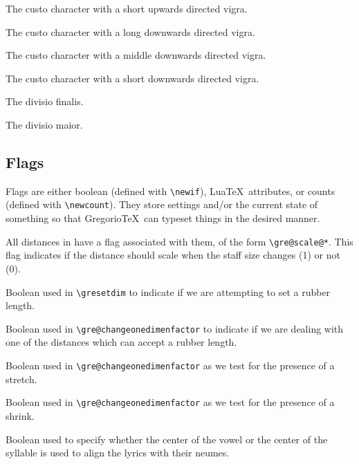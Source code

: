 The custo character with a short upwards directed vigra.

The custo character with a long downwards directed vigra.

The custo character with a middle downwards directed vigra.

The custo character with a short downwards directed vigra.

The divisio finalis.

The divisio maior.


\subsection{Flags}

Flags are either boolean (defined with \verb=\newif=), Lua\TeX\ attributes, or counts (defined with \verb=\newcount=).  They store settings and/or the current state of something so that Gregorio\TeX\ can typeset things in the desired manner.

All distances in  have a flag associated with them, of the form \verb=\gre@scale@*=.  This flag
indicates if the distance should scale when the staff size changes (1)
or not (0).

Boolean used in \verb=\gresetdim= to indicate if we are attempting to set a rubber length.

Boolean used in \verb=\gre@changeonedimenfactor= to indicate if we are dealing with one of the distances which can accept a rubber length.

Boolean used in \verb=\gre@changeonedimenfactor= as we test for the presence of a stretch.

Boolean used in \verb=\gre@changeonedimenfactor= as we test for the presence of a shrink.

Boolean used to specify whether the center of the vowel or the center of the syllable is used to align the lyrics with their neumes.

